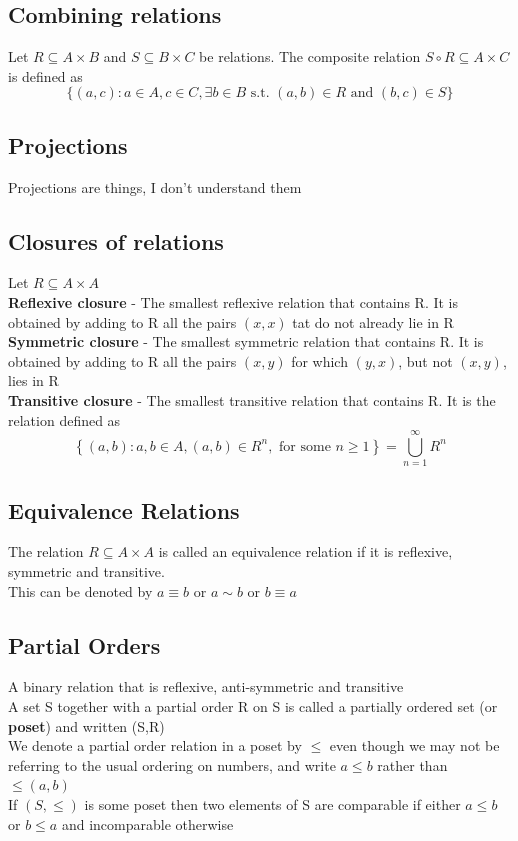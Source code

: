 \documentclass{article}[18pt]
\begin{document}
\subsection{Combining relations}
Let $R\subseteq A\times B$ and $S\subseteq B\times C$ be relations. The composite relation $S\circ R\subseteq A\times C$ is defined as
\[
\{(a, c) : a \in A, c \in C, \exists b \in B \text { s.t. }(a, b) \in R \text { and }(b, c) \in S\}
\]
\subsection{Projections}
Projections are things, I don't understand them
\subsection{Closures of relations}
Let $R\subseteq A\times A$\\
\textbf{Reflexive closure} - The smallest reflexive relation that contains R. It is obtained by adding to R all the pairs $(x,x)$ tat do not already lie in R\\
\textbf{Symmetric closure} - The smallest symmetric relation that contains R. It is obtained by adding to R all the pairs $(x,y)$ for which $(y,x)$, but not $(x,y)$, lies in R\\
\textbf{Transitive closure} - The smallest transitive relation that contains R. It is the relation defined as
\[
\left\{(a, b) : a, b \in A,(a, b) \in R^{n}, \text { for some } n \geq 1\right\}=\bigcup_{n=1}^{\infty} R^{n}
\]
\subsection{Equivalence Relations}
The relation $R\subseteq A\times A$ is called an equivalence relation if it is reflexive, symmetric and transitive.\\
This can be denoted by $a\equiv b$ or $a\sim b$ or $b\equiv a$
\subsection{Partial Orders}
A binary relation that is reflexive, anti-symmetric and transitive\\
A set S together with a partial order R on S is called a partially ordered set (or \textbf{poset}) and written (S,R)\\
We denote a partial order relation in a poset by $\leq$ even though we may not be referring to the usual ordering on numbers, and write $a\leq b$ rather than $\leq(a,b)$\\
If $(S,\leq)$ is some poset then two elements of S are comparable if either $a\leq b$ or $b\leq a$ and incomparable otherwise
\end{document}
